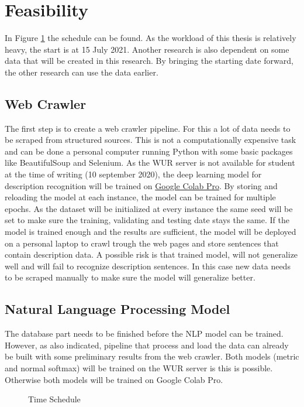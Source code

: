 \documentclass{article}
\begin{document}
\section{Feasibility}
In Figure \ref{fig:time_schedule} the schedule can be found. 
As the workload of this thesis is relatively heavy, the start is at 15 July 2021.
Another research is also dependent on some data that will be created in this research.
By bringing the starting date forward, the other research can use the data earlier.
\subsection{Web Crawler}
The first step is to create a web crawler pipeline. 
For this a lot of data needs to be scraped from structured sources.
This is not a computationally expensive task and can be done a personal computer running Python with some basic packages like BeautifulSoup and Selenium.
As the WUR server is not available for student at the time of writing (10 september 2020), the deep learning model for description recognition will be trained on \href{https://colab.research.google.com/}{Google Colab Pro}. 
By storing and reloading the model at each instance, the model can be trained for multiple epochs.
As the dataset will be initialized at every instance the same seed will be set to make sure the training, validating and testing date stays the same.
If the model is trained enough and the results are sufficient, the model will be deployed on a personal laptop to crawl trough the web pages and store sentences that contain description data.
A possible risk is that trained model, will not generalize well and will fail to recognize description sentences.
In this case new data needs to be scraped manually to make sure the model will generalize better.
\subsection{Natural Language Processing Model}
The database part needs to be finished before the NLP model can be trained.
However, as also indicated, pipeline that process and load the data can already be built with some preliminary results from the web crawler.
Both models (metric and normal softmax) will be trained on the WUR server is this is possible. 
Otherwise both models will be trained on Google Colab Pro.


\begin{figure} [t]
    \centering
    \vspace{-2.5cm}
    \hspace{-1.3cm}
    \makebox[\textwidth][c]{}
    \caption{Time Schedule}
    \label{fig:time_schedule}
\end{figure}

\newpage
\printbibliography
\end{document}
